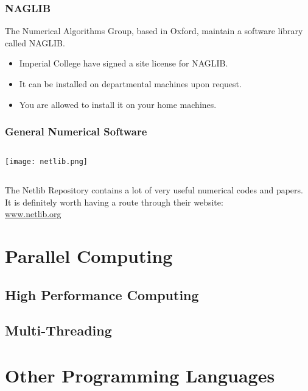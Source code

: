 \documentclass[smaller,table]{beamer} %
\begin{document}
\begin{frame}
\frametitle{NAGLIB}
The Numerical Algorithms Group, based in Oxford, maintain a software library called NAGLIB.
\begin{itemize}
\item Imperial College have signed a site license for NAGLIB.
\item It can be installed on departmental machines upon request.
\item You are allowed to install it on your home machines.
\end{itemize}
\end{frame}

\begin{frame}
\frametitle{General Numerical Software}
\begin{center}
\begin{columns}
\begin{column}{0.3\textwidth}
\texttt{[image: netlib.png]}\\
\end{column}
\end{columns}
The Netlib Repository contains a lot of very useful numerical codes and papers. It is definitely worth having a route through their website:\\
\url{www.netlib.org}
\end{center}
\end{frame}

\section{Parallel Computing}
\subsection{High Performance Computing}
\subsection{Multi-Threading}

\section{Other Programming Languages}
\end{document}
